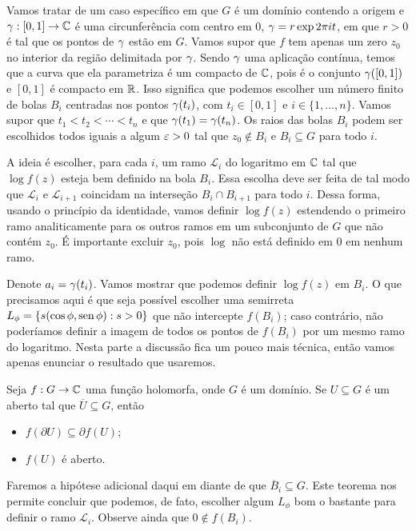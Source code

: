     Vamos tratar de um caso específico em que $G$ é um domínio contendo a origem e 
    $\gamma: [0,1] \to \mathbb{C}$ é uma circunferência com centro em $0$, $\gamma = r\exp{2 \pi i t}$, 
    em que $r > 0$ é tal que os pontos de $\gamma$ estão em $G$. 
    Vamos supor que $f$ tem apenas um zero $z_0$ no interior da região delimitada por $\gamma$. 
    Sendo $\gamma$ uma aplicação contínua, temos que a curva que ela parametriza é um compacto de $\mathbb{C}$, 
    pois é o conjunto $\gamma([0,1])$ e $[0,1]$ é compacto em $\mathbb{R}$. 
    Isso significa que podemos escolher um número finito de bolas $B_i$ centradas nos pontos 
    $\gamma(t_i)$, com $t_i \in [0,1]$ e $i \in \{1,\dots, n\}$. 
    Vamos supor que $t_1 < t_2 < \cdots < t_n$ e que $\gamma(t_1) = \gamma(t_n)$.  
    Os raios das bolas $B_i$ podem ser escolhidos todos iguais a
    algum $\varepsilon > 0$ tal que $z_0 \not \in B_i$ e $B_i \subseteq G$ para todo $i$.
    
    A ideia é escolher, para cada $i$, um ramo $\mathcal{L}_i$ do logaritmo em $\mathbb{C}$ tal que 
    $\log f(z)$ esteja bem definido na bola $B_i$. Essa escolha deve ser feita de tal modo que
    $\mathcal{L}_i$ e $\mathcal{L}_{i+1}$ coincidam na interseção $B_i \cap B_{i+1}$ para todo $i$.
    Dessa forma, usando o princípio da identidade, vamos definir $\log f(z)$ estendendo o primeiro
    ramo analiticamente para os outros ramos em um subconjunto de $G$ que não contém $z_0$. 
    É importante excluir $z_0$, pois $\log$ não está definido em $0$ em nenhum ramo.
    
    Denote $a_i = \gamma(t_i)$. Vamos mostrar que podemos definir $\log f(z)$ em $B_i$. 
    O que precisamos aqui é que seja possível escolher uma semirreta 
    $L_\phi = \{s(\cos \phi, \operatorname{sen} \phi): s > 0\}$ que não intercepte $f(B_i)$; caso contrário, 
    não poderíamos definir a imagem de todos os pontos de $f(B_i)$ por um mesmo ramo do logaritmo.
    Nesta parte a discussão fica um pouco mais técnica, então vamos apenas enunciar o resultado 
    que usaremos. 
    \begin{teorema}
        Seja $f: G \to \mathbb{C}$ uma função holomorfa, onde $G$ é um domínio. 
        Se $U \subseteq G$ é um aberto tal que $\overline{U} \subseteq G$, então
        \begin{itemize}
            \item $f(\partial U) \subseteq \partial f(U)$;
            \item $f(U)$ é aberto.
        \end{itemize}
    \end{teorema}
    Faremos a hipótese adicional daqui em diante de que $\overline{B}_i \subseteq G$. 
    Este teorema nos permite concluir que podemos, de fato, escolher algum $L_\phi$ 
    bom o bastante para definir o ramo $\mathcal{L}_i$. Observe ainda que $0 \not \in f(B_i)$.
    
